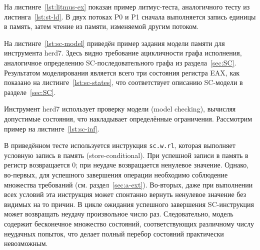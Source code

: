 На листинге~\ref{lst:litmus-ex} показан пример литмус-теста,
аналогичного тесту из листинга~\ref{lst:st-ld}. В двух потоках P0 и
P1 сначала выполняется запись единицы в память, затем чтение из
памяти, изменяемой другим потоком.

\begin{minipage}[ht]{\textwidth}
  \centering
  
\end{minipage}

На листинге~\ref{lst:sc-model} приведён пример задания модели памяти
для инструмента herd7. Здесь видно требование ацикличности графа
исполнения, аналогичное определению SC-последовательного графа из
раздела~\ref{sec:SC}. Результатом моделирования является всего три
состояния регистра EAX, как показано на листинге~\ref{lst:sc-states},
что соответствует описанию SC-модели в разделе~\ref{sec:SC}.

\begin{minipage}[ht]{\textwidth}
  \centering
  
\end{minipage}

\begin{minipage}[ht]{1\textwidth}
  \centering
  
\end{minipage}

Инструмент herd7 использует проверку модели (model checking),
вычисляя допустимые состояния, что накладывает определённые
ограничения. Рассмотрим пример на листинге~\ref{lst:sc-inf}.

\begin{minipage}[b]{1\textwidth}
  \centering
  
\end{minipage}

В приведённом тесте используется инструкция \texttt{sc.w.rl}, которая
выполняет условную запись в память (store-conditional). При
успешной записи в память в регистр возвращается 0; при неудаче возвращается
ненулевое значение.
Однако, во-первых, для успешного завершения операции необходимо
соблюдение множества требований (см. раздел~\ref{sec:a-ext}).
Во-вторых, даже при выполнении всех условий эта инструкция может
спонтанно вернуть ненулевое значение без видимых на то причин.
В цикле ожидания успешного завершения
SC-инструкция может возвращать неудачу произвольное число раз.
Следовательно, модель содержит бесконечное
множество состояний, соответствующих различному числу неудачных
попыток, что делает полный перебор состояний практически невозможным.

